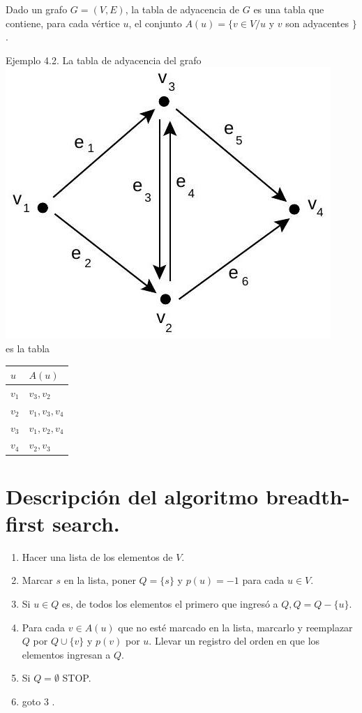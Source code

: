 \documentclass[10pt]{article}
\begin{document}
Dado un grafo $G=(V, E)$, la tabla de adyacencia de $G$ es una tabla que contiene, para cada vértice $u$, el conjunto $A(u)=\{v \in V / u$ y $v$ son adyacentes $\}$.

Ejemplo 4.2. La tabla de adyacencia del grafo\\
\includegraphics[max width=\textwidth, center]{2025_09_05_93c7c1835f249f70c0eeg-08}\\
es la tabla

\begin{center}
\begin{tabular}{|l|l|}
\hline
$u$ & $A(u)$ \\
\hline
$v_{1}$ & $v_{3}, v_{2}$ \\
\hline
$v_{2}$ & $v_{1}, v_{3}, v_{4}$ \\
\hline
$v_{3}$ & $v_{1}, v_{2}, v_{4}$ \\
\hline
$v_{4}$ & $v_{2}, v_{3}$ \\
\hline
\end{tabular}
\end{center}

\section*{Descripción del algoritmo breadth-first search.}
\begin{enumerate}
  \item Hacer una lista de los elementos de $V$.
  \item Marcar $s$ en la lista, poner $Q=\{s\}$ y $p(u)=-1$ para cada $u \in V$.
  \item Si $u \in Q$ es, de todos los elementos el primero que ingresó a $Q, Q=Q-\{u\}$.
  \item Para cada $v \in A(u)$ que no esté marcado en la lista, marcarlo y reemplazar $Q$ por $Q \cup\{v\}$ y $p(v)$ por $u$. Llevar un registro del orden en que los elementos ingresan a $Q$.
  \item Si $Q=\emptyset$ STOP.
  \item goto 3 .
\end{enumerate}
\end{document}
